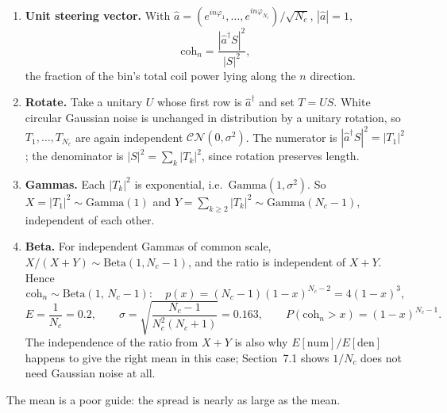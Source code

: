 \documentclass[11pt]{article}
\begin{document}
\begin{enumerate}
\item \textbf{Unit steering vector.} With
  $\hat a = (e^{in\varphi_1},\dots,e^{in\varphi_{N_c}})/\sqrt{N_c}$, $|\hat a|=1$,
  \[
  \mathrm{coh}_n = \frac{|\hat a^{\dagger} S|^2}{|S|^2},
  \]
  the fraction of the bin's total coil power lying along the $n$ direction.
\item \textbf{Rotate.} Take a unitary $U$ whose first row is $\hat a^{\dagger}$
  and set $T=US$. White circular Gaussian noise is unchanged in distribution
  by a unitary rotation, so $T_1,\dots,T_{N_c}$ are again independent
  $\mathcal{CN}(0,\sigma^2)$. The numerator is $|\hat a^{\dagger}S|^2=|T_1|^2$;
  the denominator is $|S|^2=\sum_k|T_k|^2$, since rotation preserves length.
\item \textbf{Gammas.} Each $|T_k|^2$ is exponential, i.e.\
  $\mathrm{Gamma}(1,\sigma^2)$. So $X=|T_1|^2\sim\mathrm{Gamma}(1)$ and
  $Y=\sum_{k\ge2}|T_k|^2\sim\mathrm{Gamma}(N_c-1)$, independent of each other.
\item \textbf{Beta.} For independent Gammas of common scale,
  $X/(X+Y)\sim\mathrm{Beta}(1,N_c-1)$, and the ratio is independent of
  $X+Y$. Hence
  \[
  \mathrm{coh}_n \sim \mathrm{Beta}(1,\,N_c-1):\quad
  p(x) = (N_c-1)(1-x)^{N_c-2} = 4(1-x)^3,
  \]
  \[
  E = \frac{1}{N_c} = 0.2,\qquad
  \sigma = \sqrt{\frac{N_c-1}{N_c^2(N_c+1)}} = 0.163,\qquad
  P(\mathrm{coh}_n > x) = (1-x)^{N_c-1}.
  \]
  The independence of the ratio from $X+Y$ is also why
  $E[\text{num}]/E[\text{den}]$ happens to give the right mean in this case;
  Section~7.1 shows $1/N_c$ does not need Gaussian noise at all.
\end{enumerate}
The mean is a poor guide: the spread is nearly as large as the mean.
\end{document}
